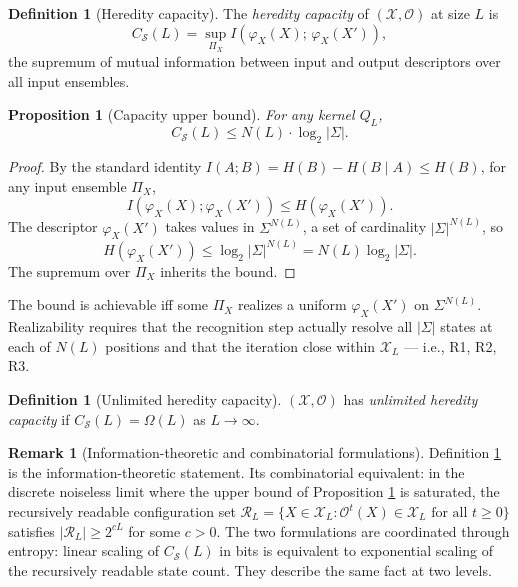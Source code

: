 \documentclass[11pt]{article}
\theoremstyle{plain}
\newtheorem{proposition}[theorem]{Proposition}
\theoremstyle{definition}
\newtheorem{definition}[theorem]{Definition}
\newtheorem{remark}[theorem]{Remark}
\newcommand{\Csub}{C_{\mathcal{S}}}
\newcommand{\descX}{\varphi_X}
\newcommand{\Xset}{\mathcal{X}}
\newcommand{\Op}{\mathcal{O}}
\newcommand{\Reach}{\mathcal{R}}
\begin{document}
\begin{definition}[Heredity capacity]
\label{def:heredity_capacity}
The \emph{heredity capacity} of $(\Xset, \Op)$ at size $L$ is
\begin{equation}
\Csub(L) = \sup_{\Pi_X} I\!\left(\descX(X);\, \descX(X')\right),
\end{equation}
the supremum of mutual information between input and output descriptors over all input ensembles.
\end{definition}

\begin{proposition}[Capacity upper bound]
\label{prop:capacity_upper}
For any kernel $Q_L$,
\begin{equation}
\Csub(L) \le N(L) \cdot \log_2 |\Sigma|.
\end{equation}
\end{proposition}

\begin{proof}
By the standard identity $I(A; B) = H(B) - H(B \mid A) \le H(B)$, for any input ensemble $\Pi_X$,
\[
I(\descX(X); \descX(X')) \le H(\descX(X')).
\]
The descriptor $\descX(X')$ takes values in $\Sigma^{N(L)}$, a set of cardinality $|\Sigma|^{N(L)}$, so
\[
H(\descX(X')) \le \log_2 |\Sigma|^{N(L)} = N(L) \log_2 |\Sigma|.
\]
The supremum over $\Pi_X$ inherits the bound.
\end{proof}

The bound is achievable iff some $\Pi_X$ realizes a uniform $\descX(X')$ on $\Sigma^{N(L)}$. Realizability requires that the recognition step actually resolve all $|\Sigma|$ states at each of $N(L)$ positions and that the iteration close within $\Xset_L$ --- i.e., R1, R2, R3.

\begin{definition}[Unlimited heredity capacity]
\label{def:unlimited_heredity}
$(\Xset, \Op)$ has \emph{unlimited heredity capacity} if $\Csub(L) = \Omega(L)$ as $L \to \infty$.
\end{definition}

\begin{remark}[Information-theoretic and combinatorial formulations]
\label{rem:linear_exp}
Definition \ref{def:unlimited_heredity} is the information-theoretic statement. Its combinatorial equivalent: in the discrete noiseless limit where the upper bound of Proposition \ref{prop:capacity_upper} is saturated, the recursively readable configuration set $\Reach_L = \{X \in \Xset_L : \Op^t(X) \in \Xset_L \text{ for all } t \ge 0\}$ satisfies $|\Reach_L| \ge 2^{cL}$ for some $c > 0$. The two formulations are coordinated through entropy: linear scaling of $\Csub(L)$ in bits is equivalent to exponential scaling of the recursively readable state count. They describe the same fact at two levels.
\end{remark}
\end{document}
